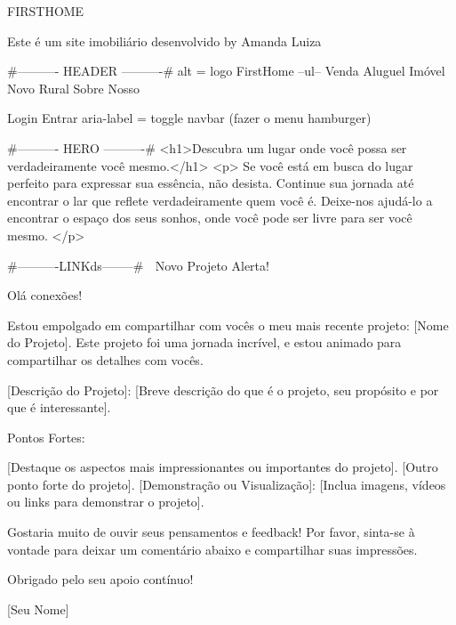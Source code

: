 FIRSTHOME

Este é um site imobiliário desenvolvido  by Amanda Luiza

#---------- HEADER ----------#
alt = logo FirstHome
--ul--
Venda
Aluguel
Imóvel Novo
Rural
Sobre Nosso

Login
Entrar
aria-label = toggle navbar
(fazer o menu hamburger)

#---------- HERO ----------#
<h1>Descubra um lugar onde você possa ser verdadeiramente você mesmo.</h1>
<p>
Se você está em busca do lugar perfeito para expressar sua essência, não desista. Continue sua jornada até encontrar o lar que reflete verdadeiramente quem você é. Deixe-nos ajudá-lo a encontrar o espaço dos seus sonhos, onde você pode ser livre para ser você mesmo.
</p>

#----------LINKds--------#
🚀 Novo Projeto Alerta! 🚀

Olá conexões!

Estou empolgado em compartilhar com vocês o meu mais recente projeto: [Nome do Projeto]. Este projeto foi uma jornada incrível, e estou animado para compartilhar os detalhes com vocês.

[Descrição do Projeto]: [Breve descrição do que é o projeto, seu propósito e por que é interessante].

Pontos Fortes:

[Destaque os aspectos mais impressionantes ou importantes do projeto].
[Outro ponto forte do projeto].
[Demonstração ou Visualização]: [Inclua imagens, vídeos ou links para demonstrar o projeto].

Gostaria muito de ouvir seus pensamentos e feedback! Por favor, sinta-se à vontade para deixar um comentário abaixo e compartilhar suas impressões.

Obrigado pelo seu apoio contínuo!

[Seu Nome]
